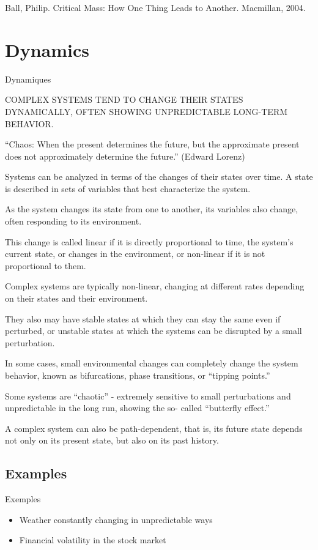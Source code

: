 \documentclass[12pt]{article}
\begin{document}
Ball, Philip. Critical Mass: How One Thing Leads to Another. Macmillan, 2004.



\section{Dynamics}{Dynamiques}

COMPLEX SYSTEMS TEND TO CHANGE THEIR STATES DYNAMICALLY, OFTEN SHOWING UNPREDICTABLE LONG-TERM BEHAVIOR.

``Chaos: When the present determines the future, but the approximate present does not approximately determine the future.'' (Edward Lorenz)

Systems can be analyzed in terms of the changes of their states over time. A state is described in sets of variables that best characterize the system.

As the system changes its state from one to another, its variables also change, often responding to its environment.

This change is called linear if it is directly proportional to time, the system’s current state, or changes in the environment, or non-linear if it is not proportional to them.


Complex systems are typically non-linear, changing at different rates depending on their states and their environment.


They also may have stable states at which they can stay the same even if perturbed, or unstable states at which the systems can be disrupted by a small perturbation.


In some cases, small environmental changes can completely change the system behavior, known as bifurcations, phase transitions, or ``tipping points.''



Some systems are ``chaotic'' - extremely sensitive to small perturbations and unpredictable in the long run, showing the so- called ``butterfly effect.''


A complex system can also be path-dependent, that is, its future state depends not only on its present state, but also on its past history.


\subsection*{Examples}{Exemples}

\begin{itemize}
	\item Weather constantly changing in unpredictable ways
	\item Financial volatility in the stock market
\end{itemize}
\end{document}
